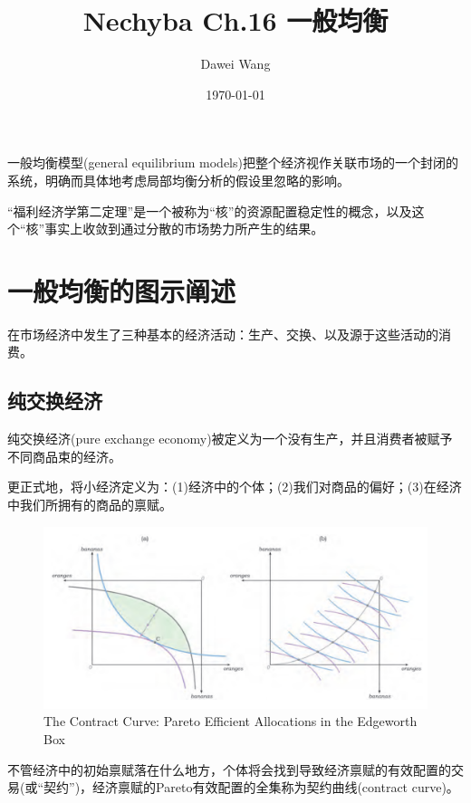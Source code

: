 \documentclass{article}
\title{Nechyba Ch.16 一般均衡}
\author{Dawei Wang}
\date{\today}
\begin{document}
	\maketitle
一般均衡模型(general equilibrium models)把整个经济视作关联市场的一个封闭的系统，明确而具体地考虑局部均衡分析的假设里忽略的影响。

“福利经济学第二定理”是一个被称为“核”的资源配置稳定性的概念，以及这个“核”事实上收敛到通过分散的市场势力所产生的结果。

\section{一般均衡的图示阐述}

在市场经济中发生了三种基本的经济活动：生产、交换、以及源于这些活动的消费。

\subsection{纯交换经济}

纯交换经济(pure exchange economy)被定义为一个没有生产，并且消费者被赋予不同商品束的经济。

更正式地，将小经济定义为：(1)经济中的个体；(2)我们对商品的偏好；(3)在经济中我们所拥有的商品的禀赋。

\begin{figure}[H] %
	\centering %
	\includegraphics[width=1\textwidth]{16_1} %
	\caption{The Contract Curve: Pareto Efficient Allocations in the Edgeworth Box} %
	\label{Fig.main2} %
\end{figure}

不管经济中的初始禀赋落在什么地方，个体将会找到导致经济禀赋的有效配置的交易(或“契约”)，经济禀赋的Pareto有效配置的全集称为契约曲线(contract curve)。
\end{document}
